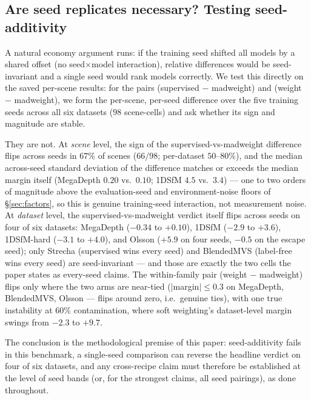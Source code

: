 \documentclass{article}
\newcommand{\mad}{madweight}
\begin{document}
\subsection{Are seed replicates necessary? Testing seed-additivity}\label{sec:interaction}
A natural economy argument runs: if the training seed shifted all models by a shared
offset (no seed$\times$model interaction), relative differences would be seed-invariant
and a single seed would rank models correctly. We test this directly on the saved
per-scene results: for the pairs (supervised $-$ \mad{}) and (weight $-$ \mad{}), we
form the per-scene, per-seed difference over the five training seeds across all six
datasets ($98$ scene-cells) and ask whether its sign and magnitude are stable.

They are not. At \emph{scene} level, the sign of the supervised-vs-\mad{} difference
flips across seeds in $67\%$ of scenes ($66/98$; per-dataset $50$--$80\%$), and the
median across-seed standard deviation of the difference matches or exceeds the median
margin itself (MegaDepth $0.20$ vs.\ $0.10$; 1DSfM $4.5$ vs.\ $3.4$) --- one to two
orders of magnitude above the evaluation-seed and environment-noise floors of
\S\ref{sec:factors}, so this is genuine training-seed interaction, not measurement
noise. At \emph{dataset} level, the supervised-vs-\mad{} verdict itself flips across
seeds on four of six datasets: MegaDepth ($-0.34$ to $+0.10$), 1DSfM ($-2.9$ to
$+3.6$), 1DSfM-hard ($-3.1$ to $+4.0$), and Olsson ($+5.9$ on four seeds, $-0.5$ on
the escape seed); only Strecha (supervised wins every seed) and BlendedMVS (label-free
wins every seed) are seed-invariant --- and those are exactly the two cells the paper
states as every-seed claims. The within-family pair (weight $-$ \mad{}) flips only
where the two arms are near-tied ($|$margin$| \le 0.3$ on MegaDepth, BlendedMVS,
Olsson --- flips around zero, i.e.\ genuine ties), with one true instability at
$60\%$ contamination, where soft weighting's dataset-level margin swings from $-2.3$
to $+9.7$.

The conclusion is the methodological premise of this paper: seed-additivity fails in
this benchmark, a single-seed comparison can reverse the headline verdict on four of
six datasets, and any cross-recipe claim must therefore be established at the level of
seed bands (or, for the strongest claims, all seed pairings), as done throughout.
\end{document}
